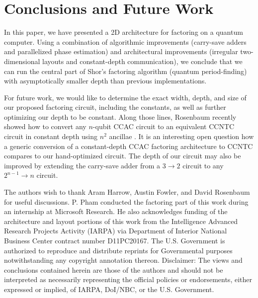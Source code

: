 \section{Conclusions and Future Work}
\label{sec:conclude}

In this paper, we have presented a 2D architecture for factoring on a quantum
computer.
Using a combination of algorithmic
improvements (carry-save adders and parallelized phase estimation) 
and architectural improvements (irregular two-dimensional layouts and
constant-depth communication), we conclude
that we can run
the central part of Shor's factoring algorithm (quantum period-finding)
with asymptotically smaller depth than previous implementations.


For future work, we would like to determine the exact width, depth, and size of
our proposed factoring circuit, including the constants, as well as
further optimizing our depth to be constant.
Along those lines, Rosenbaum recently showed how to convert any $n$-qubit CCAC
circuit to an equivalent CCNTC circuit in constant depth using $n^2$ ancillae
\cite{Rosenbaum2012}.
It is an interesting open question how a
generic conversion of a constant-depth CCAC factoring architecture
\cite{Browne2009,Hoyer2002} to CCNTC compares to our hand-optimized circuit.
The depth of our circuit may also be improved by extending the carry-save adder
from
a $3\rightarrow 2$ circuit to any $2^{n-1}\rightarrow n$ circuit.

The authors wish to thank Aram Harrow, Austin Fowler, and David Rosenbaum for
useful discussions.
P. Pham conducted the factoring part of this work during
an internship at Microsoft Research.
He also acknowledges funding of the architecture and layout portions
of this work from
the Intelligence Advanced Research Projects Activity
(IARPA) via Department of Interior National Business Center contract
number D11PC20167. The U.S. Government is authorized to reproduce and
distribute reprints for Governmental purposes notwithstanding any
copyright annotation thereon. Disclaimer: The views and conclusions
contained herein are those of the authors and should not be
interpreted as necessarily representing the official policies or
endorsements, either expressed or implied, of IARPA, DoI/NBC, or the
U.S. Government.
